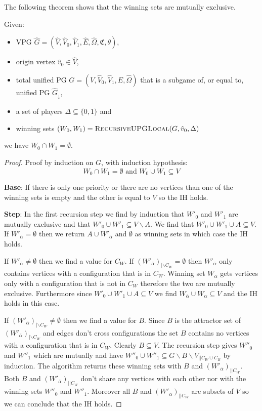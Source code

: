 The following theorem shows that the winning sets are mutually exclusive.
\begin{theorem}Given:
	\begin{itemize}
		\item VPG $\hat{G} = (\hat{V}, \hat{V}_0,\hat{V}_1,\hat{E},\hat{\Omega},\mathfrak{C},\theta)$,
		\item origin vertex $\hat{v}_0 \in \hat{V}$,
		\item total unified PG $G = (V, \hat{V}_0, \hat{V}_1,E,\hat{\Omega})$ that is a subgame of, or equal to, unified PG $\hat{G}_{\downarrow}$,
		\item a set of players $\Delta \subseteq \{0,1\}$ and
		\item winning sets $(W_0,W_1) = \textsc{RecursiveUPGLocal}(G,\hat{v}_0,\Delta)$
	\end{itemize}
	we have $W_0\cap W_1 = \emptyset$.
	\begin{proof}
		Proof by induction on $G$, with induction hypothesis:
		\[ W_0\cap W_1 = \emptyset\text{ and }W_0 \cup W_1 \subseteq V \]
		
		\textbf{Base}: If there is only one priority or there are no vertices than one of the winning sets is empty and the other is equal to $V$ so the IH holds.
		
		\textbf{Step}: In the first recursion step we find by induction that $W'_0$ and $W'_1$ are mutually exclusive and that $W'_0 \cup W'_1 \subseteq V\backslash A$. We find that $W'_0 \cup W'_1 \cup A \subseteq V$. If $W'_{\overline{\alpha}} = \emptyset$ then we return $A\cup W'_{\overline{\alpha}}$ and $\emptyset$ as winning sets in which case the IH holds.
		
		If $W'_{\overline{\alpha}} \neq \emptyset$ then we find a value for $C_W$. If $(W'_{\overline{\alpha}})_{|\backslash C_W} = \emptyset$ then $W'_{\overline{\alpha}}$ only contains vertices with a configuration that is in $C_W$. Winning set $W_\alpha$ gets vertices only with a configuration that is not in $C_W$ therefore the two are mutually exclusive. Furthermore since $W'_0 \cup W'_1 \cup A \subseteq V$ we find $W_{\overline{\alpha}} \cup W_\alpha \subseteq V$ and the IH holds in this case.
		
		If $(W'_{\overline{\alpha}})_{|\backslash C_W} \neq \emptyset$ then we find a value for $B$. Since $B$ is the attractor set of $(W'_{\overline{\alpha}})_{|\backslash C_W}$ and edges don't cross configurations the set $B$ contains no vertices with a configuration that is in $C_W$. Clearly $B \subseteq V$. The recursion step gives $W''_0$ and $W''_1$ which are mutually and have $W''_0 \cup W''_1 \subseteq G\backslash B \backslash V_{||C_W\cup C_B}$ by induction. The algorithm returns these winning sets with $B$ and $(W'_{\overline{\alpha}})_{||C_W}$. Both $B$ and $(W'_{\overline{\alpha}})_{||C_W}$ don't share any vertices with each other nor with the winning sets $W''_0$ and $W''_1$. Moreover all $B$ and $(W'_{\overline{\alpha}})_{||C_W}$ are subsets of $V$ so we can conclude that the IH holds.
	\end{proof}
\end{theorem}

